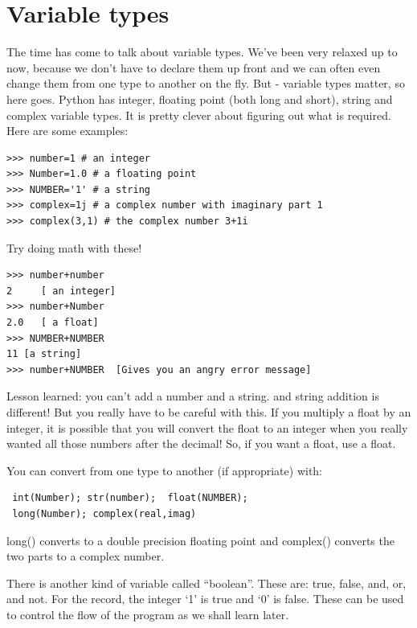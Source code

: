 \documentclass[11pt]{book}
\begin{document}
{{\section{Variable types}

The time has come to talk about variable types.  We've been very relaxed up to now, because we don't have to declare them up front and we can often even change them from one type to another on the fly.  But - variable types matter, so here goes. Python has integer, floating point (both long and short), string and complex variable types.  It is pretty clever about figuring out what is required.   Here are some examples:

{ \color{blue} \begin{verbatim}
>>> number=1 # an integer
>>> Number=1.0 # a floating point
>>> NUMBER='1' # a string
>>> complex=1j # a complex number with imaginary part 1
>>> complex(3,1) # the complex number 3+1i 
\end{verbatim}}
\noindent
{Try doing math with these!}
{ \color{blue} \begin{verbatim}
>>> number+number
2     [ an integer]
>>> number+Number
2.0   [ a float]
>>> NUMBER+NUMBER
11 [a string]
>>> number+NUMBER  [Gives you an angry error message]
\end{verbatim}}
\noindent
 Lesson learned: you can't add a number and a string.  and string addition is different!  But you really have to be careful with this.  If you multiply a float by an integer, it is possible that you will convert the float to an integer when you really wanted all those numbers after the decimal! So, if you want a float, use a float.  
 
{ You can convert from one type to another (if appropriate) with:}
{ \color{blue} \begin{verbatim} 
 int(Number); str(number);  float(NUMBER); 
 long(Number); complex(real,imag)
 \end{verbatim}}
 
\noindent 
{\color{blue}long()} converts to a double precision floating point and {\color{blue}complex()} converts the two parts to a complex number.
 
 There is another kind of variable called ``boolean''. These are: {\color{blue}true}, {\color{blue}false}, {\color{blue}and}, {\color{blue}or}, and {\color{blue}not}.
For the record, the integer  `1' is {\color{blue}true} and  `0' is {\color{blue}false}.  
These can be used to control the flow of the program as we shall learn later.  

}}
\end{document}
